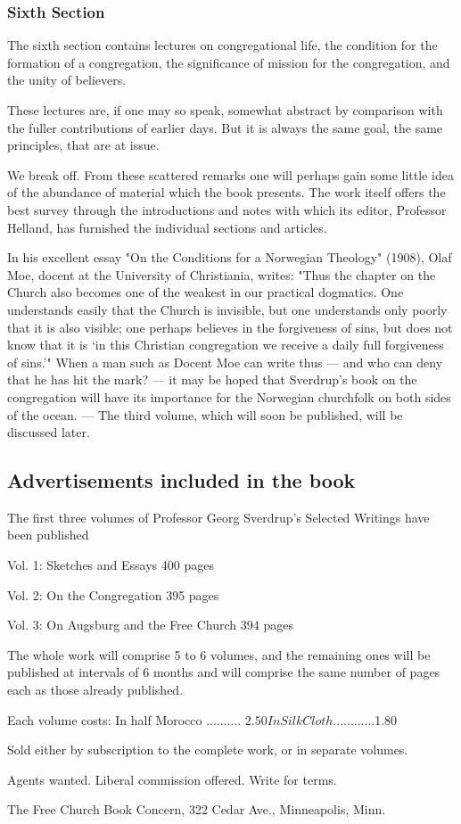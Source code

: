 \subsubsection{Sixth Section}

The sixth section contains lectures on congregational life, the condition for the formation of a congregation, the significance of mission for the congregation, and the unity of believers.

These lectures are, if one may so speak, somewhat abstract by comparison with the fuller contributions of earlier days. But it is always the same goal, the same principles, that are at issue.

We break off. From these scattered remarks one will perhaps gain some little idea of the abundance of material which the book presents. The work itself offers the best survey through the introductions and notes with which its editor, Professor Helland, has furnished the individual sections and articles.

In his excellent essay "On the Conditions for a Norwegian Theology" (1908), Olaf Moe, docent at the University of Christiania, writes: "Thus the chapter on the Church also becomes one of the weakest in our practical dogmatics. One understands easily that the Church is invisible, but one understands only poorly that it is also visible; one perhaps believes in the forgiveness of sins, but does not know that it is ‘in this Christian congregation we receive a daily full forgiveness of sins.’" When a man such as Docent Moe can write thus — and who can deny that he has hit the mark? — it may be hoped that Sverdrup’s book on the congregation will have its importance for the Norwegian churchfolk on both sides of the ocean. — The third volume, which will soon be published, will be discussed later.


\subsection {Advertisements included in the book} 

The first three volumes of Professor Georg Sverdrup’s Selected Writings have been published

Vol. 1:
Sketches and Essays
400 pages

Vol. 2:
On the Congregation
395 pages

Vol. 3:
On Augsburg and the Free Church
394 pages

The whole work will comprise 5 to 6 volumes, and the remaining ones will be published at intervals of 6 months and will comprise the same number of pages each as those already published.

Each volume costs:
In half Morocco .......... $2.50
In Silk Cloth ............ $1.80

Sold either by subscription to the complete work, or in separate volumes.


Agents wanted.
Liberal commission offered.
Write for terms.

The Free Church Book Concern,
322 Cedar Ave.,
Minneapolis, Minn.
